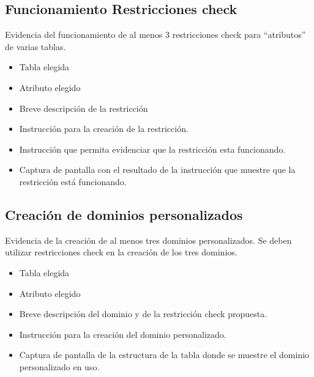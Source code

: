 \subsection{Funcionamiento Restricciones check}

Evidencia del funcionamiento de al menos 3 restricciones check para “atributos” de varias
tablas.

\begin{itemize}
    \item Tabla elegida
    \item Atributo elegido
    \item Breve descripción de la restricción
    \item Instrucción para la creación de la restricción.
    \item Instrucción que permita evidenciar que la restricción esta funcionando.
    \item Captura de pantalla con el resultado de la instrucción que muestre que la restricción está
    funcionando.
\end{itemize}




\subsection{Creación de dominios personalizados}

Evidencia de la creación de al menos tres dominios personalizados. Se deben utilizar restricciones check en la creación de los tres dominios.
\begin{itemize}
    \item Tabla elegida
    \item Atributo elegido
    \item Breve descripción del dominio y de la restricción check propuesta.
    \item Instrucción para la creación del dominio personalizado.
    \item Captura de pantalla de la estructura de la tabla donde se muestre el dominio personalizado
    en uso.
\end{itemize}



